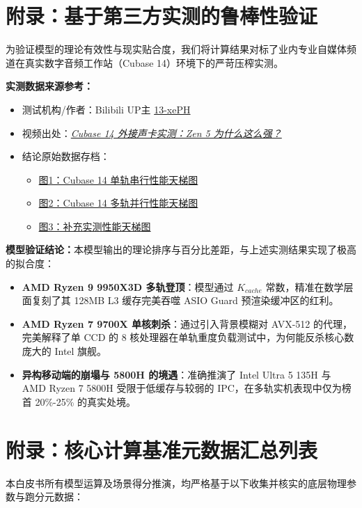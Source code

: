 \documentclass[11pt, a4paper]{article}
\begin{document}
\appendix
\section{附录：基于第三方实测的鲁棒性验证}
为验证模型的理论有效性与现实贴合度，我们将计算结果对标了业内专业自媒体频道在真实数字音频工作站（Cubase 14）环境下的严苛压榨实测。

\textbf{实测数据来源参考：}
\begin{itemize}
    \item 测试机构/作者：Bilibili UP主 \href{https://space.bilibili.com/264259}{13-xePH}
    \item 视频出处：\href{https://www.bilibili.com/video/BV1xqtTzEEWz}{\textit{Cubase 14 外接声卡实测：Zen 5 为什么这么强？}} \cite{bilibili13xeph}
    \item 结论原始数据存档：
    \begin{itemize}
        \item \href{http://i0.hdslb.com/bfs/new_dyn/ead77ca63f36fd535e9fe69f98b16fe0378547350.jpg}{图1：Cubase 14 单轨串行性能天梯图}
        \item \href{http://i0.hdslb.com/bfs/new_dyn/2f698fa335d69cca4d23979ea0769b31378547350.jpg}{图2：Cubase 14 多轨并行性能天梯图}
        \item \href{http://i0.hdslb.com/bfs/new_dyn/7e1d3bffeda9a52799b33af08922b8ff378547350.jpg}{图3：补充实测性能天梯图}
    \end{itemize}
\end{itemize}

\textbf{模型验证结论：}本模型输出的理论排序与百分比差距，与上述实测结果实现了极高的拟合度：
\begin{itemize}
    \item \textbf{AMD Ryzen 9 9950X3D 多轨登顶}：模型通过 $K_{cache}$ 常数，精准在数学层面复刻了其 128MB L3 缓存完美吞噬 ASIO Guard 预渲染缓冲区的红利。
    \item \textbf{AMD Ryzen 7 9700X 单核刺杀}：通过引入背景模糊对 AVX-512 的代理，完美解释了单 CCD 的 8 核处理器在单轨重度负载测试中，为何能反杀核心数庞大的 Intel 旗舰。
    \item \textbf{异构移动端的崩塌与 5800H 的境遇}：准确推演了 Intel Ultra 5 135H 与 AMD Ryzen 7 5800H 受限于低缓存与较弱的 IPC，在多轨实机表现中仅为榜首 20\%-25\% 的真实处境。
\end{itemize}

\section{附录：核心计算基准元数据汇总列表}
本白皮书所有模型运算及场景得分推演，均严格基于以下收集并核实的底层物理参数与跑分元数据：
\end{document}
